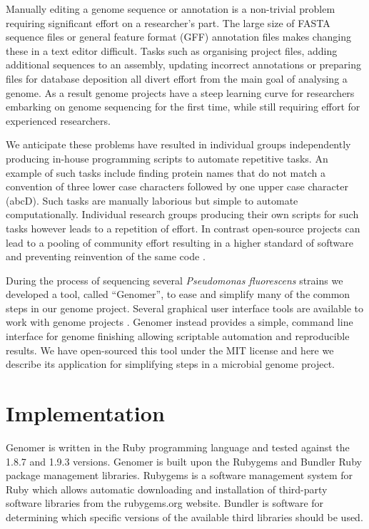 \documentclass[10pt]{article}
\begin{document}
Manually editing a genome sequence or annotation is a non-trivial problem
requiring significant effort on a researcher's part. The large size of FASTA
sequence files or general feature format (GFF) annotation files makes changing
these in a text editor difficult. Tasks such as organising project files,
adding additional sequences to an assembly, updating incorrect annotations or
preparing files for database deposition all divert effort from the main goal of
analysing a genome. As a result genome projects have a steep learning curve for
researchers embarking on genome sequencing for the first time, while still
requiring effort for experienced researchers.

We anticipate these problems have resulted in individual groups independently
producing in-house programming scripts to automate repetitive tasks. An example
of such tasks include finding protein names that do not match a convention of
three lower case characters followed by one upper case character (abcD). Such
tasks are manually laborious but simple to automate computationally. Individual
research groups producing their own scripts for such tasks however leads to a
repetition of effort. In contrast open-source projects can lead to a pooling of
community effort resulting in a higher standard of software and preventing
reinvention of the same code \cite{ince2012}.

During the process of sequencing several \emph{Pseudomonas fluorescens} strains
we developed a tool, called ``Genomer'', to ease and simplify many of the
common steps in our genome project. Several graphical user interface tools are
available to work with genome projects \cite{tanaka2006, wilkinson2002,
lopez2011, carver2012, gordon2003}. Genomer instead provides a simple, command
line interface for genome finishing allowing scriptable automation and
reproducible results. We have open-sourced this tool under the MIT license and
here we describe its application for simplifying steps in a microbial genome
project.

\section*{Implementation}

Genomer is written in the Ruby programming language \cite{ruby-lang,goto2010}
and tested against the 1.8.7 and 1.9.3 versions. Genomer is built upon the
Rubygems and Bundler Ruby package management libraries. Rubygems is a software
management system for Ruby which allows automatic downloading and installation
of third-party software libraries from the rubygems.org website. Bundler is
software for determining which specific versions of the available third
libraries should be used.
\end{document}
